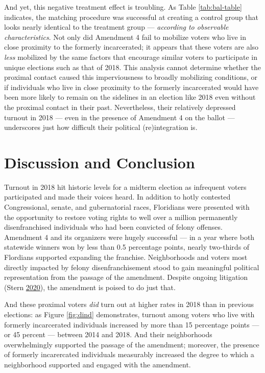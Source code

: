 \documentclass[
  12pt,
]{article}
\begin{document}
And yet, this negative treatment effect is troubling. As Table \ref{tab:bal-table} indicates, the matching procedure was successful at creating a control group that looks nearly identical to the treatment group --- \emph{according to observable characteristics}. Not only did Amendment 4 fail to mobilize voters who live in close proximity to the formerly incarcerated; it appears that these voters are also \emph{less} mobilized by the same factors that encourage similar voters to participate in unique elections such as that of 2018. This analysis cannot determine whether the proximal contact caused this imperviousness to broadly mobilizing conditions, or if individuals who live in close proximity to the formerly incarcerated would have been more likely to remain on the sidelines in an election like 2018 even without the proximal contact in their past. Nevertheless, their relatively depressed turnout in 2018 --- even in the presence of Amendment 4 on the ballot --- underscores just how difficult their political (re)integration is.

\hypertarget{discussion-and-conclusion}{%
\section*{Discussion and Conclusion}\label{discussion-and-conclusion}}

Turnout in 2018 hit historic levels for a midterm election as infrequent voters participated and made their voices heard. In addition to hotly contested Congressional, senate, and gubernatorial races, Floridians were presented with the opportunity to restore voting rights to well over a million permanently disenfranchised individuals who had been convicted of felony offenses. Amendment 4 and its organizers were hugely successful --- in a year where both statewide winners won by less than 0.5 percentage points, nearly two-thirds of Flordians supported expanding the franchise. Neighborhoods and voters most directly impacted by felony disenfranchisement stood to gain meaningful political representation from the passage of the amendment. Despite ongoing litigation (Stern \protect\hyperlink{ref-Stern2020}{2020}), the amendment is poised to do just that.

And these proximal voters \emph{did} turn out at higher rates in 2018 than in previous elections: as Figure \ref{fig:dind} demonstrates, turnout among voters who live with formerly incarcerated individuals increased by more than 15 percentage points --- or 45 percent --- between 2014 and 2018. And their neighborhoods overwhelmingly supported the passage of the amendment; moreover, the presence of formerly incarercated individuals measurably increased the degree to which a neighborhood supported and engaged with the amendment.
\end{document}
